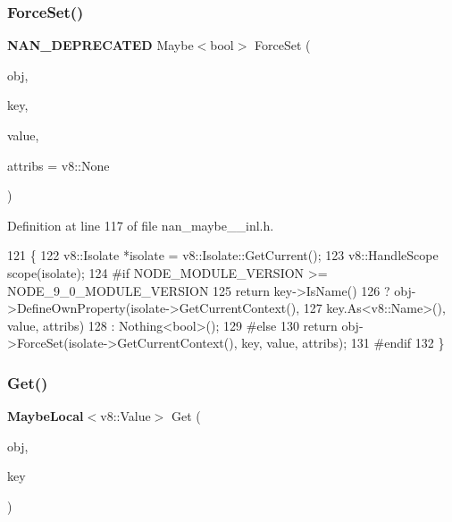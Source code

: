 \subsubsection{Force\+Set()}
{\footnotesize\ttfamily \textbf{ N\+A\+N\+\_\+\+D\+E\+P\+R\+E\+C\+A\+T\+ED} Maybe$<$bool$>$ Force\+Set (\begin{DoxyParamCaption}\item[{v8\+::\+Local$<$ v8\+::\+Object $>$}]{obj,  }\item[{v8\+::\+Local$<$ v8\+::\+Value $>$}]{key,  }\item[{v8\+::\+Local$<$ v8\+::\+Value $>$}]{value,  }\item[{v8\+::\+Property\+Attribute}]{attribs = {\ttfamily v8\+:\+:None} }\end{DoxyParamCaption})}



Definition at line 117 of file nan\+\_\+maybe\+\_\+\_\+inl.\+h.


\begin{DoxyCode}
121                                           \{
122   v8::Isolate *isolate = v8::Isolate::GetCurrent();
123   v8::HandleScope scope(isolate);
124 \textcolor{preprocessor}{#if NODE\_MODULE\_VERSION >= NODE\_9\_0\_MODULE\_VERSION}
125   \textcolor{keywordflow}{return} key->IsName()
126              ? obj->DefineOwnProperty(isolate->GetCurrentContext(),
127                                       key.As<v8::Name>(), value, attribs)
128              : Nothing<bool>();
129 \textcolor{preprocessor}{#else}
130   \textcolor{keywordflow}{return} obj->ForceSet(isolate->GetCurrentContext(), key, value, attribs);
131 \textcolor{preprocessor}{#endif}
132 \}
\end{DoxyCode}
\mbox{\label{nan__maybe__43__inl_8h_a1ce359be4c4953a5d024ed717427efee}} 
\subsubsection{Get()\hspace{0.1cm}{\footnotesize\ttfamily [1/2]}}
{\footnotesize\ttfamily \textbf{ Maybe\+Local}$<$v8\+::\+Value$>$ Get (\begin{DoxyParamCaption}\item[{v8\+::\+Local$<$ v8\+::\+Object $>$}]{obj,  }\item[{v8\+::\+Local$<$ v8\+::\+Value $>$}]{key }\end{DoxyParamCaption})}



